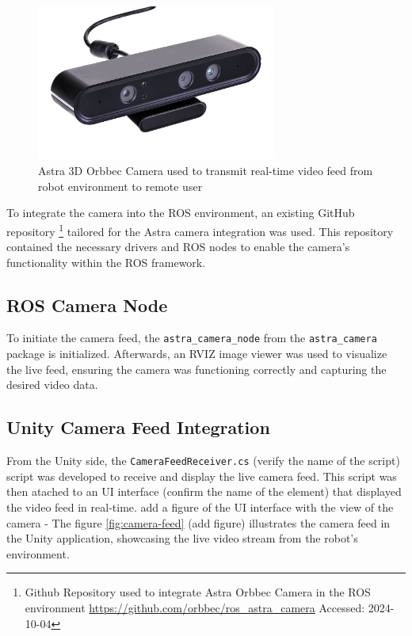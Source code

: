     \begin{figure}[h]
        \centering
        \includegraphics[width=0.7\textwidth]{figs/AstraSeries_3.jpg}
        \caption{Astra 3D Orbbec Camera used to transmit real-time video feed from robot environment to remote user}
        \label{fig:astra-camera}
    \end{figure}
    \FloatBarrier

    To integrate the camera into the ROS environment, an existing GitHub repository \footnote{Github Repository used to integrate Astra Orbbec Camera in the ROS environment \url{https://github.com/orbbec/ros_astra_camera} Accessed: 2024-10-04} tailored for the Astra camera integration was used. This repository contained the necessary drivers and ROS nodes to enable the camera's functionality within the ROS framework.

    \subsection{ROS Camera Node}
    To initiate the camera feed, the \texttt{astra\_camera\_node} from the \texttt{astra\_camera} package is initialized. Afterwards, an RVIZ image viewer was used to visualize the live feed, ensuring the camera was functioning correctly and capturing the desired video data.

    \subsection{Unity Camera Feed Integration}
    From the Unity side, the \texttt{CameraFeedReceiver.cs} (verify the name of the script) script was developed to receive and display the live camera feed. This script was then atached to an UI interface (confirm the name of the element) that displayed the video feed in real-time. 
    add a figure of the UI interface with the view of the camera - The figure \ref{fig:camera-feed} (add figure) illustrates the camera feed in the Unity application, showcasing the live video stream from the robot's environment.

